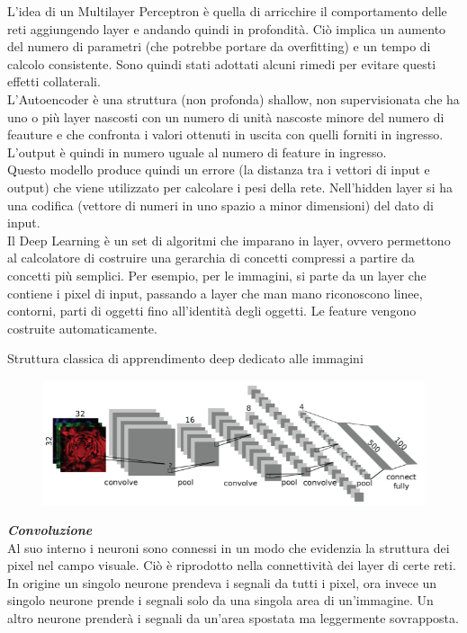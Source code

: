 L’idea di un Multilayer Perceptron è quella di arricchire il comportamento delle reti aggiungendo layer e andando quindi in profondità. Ciò implica un aumento del numero di parametri (che potrebbe portare da overfitting) e un tempo di calcolo consistente. Sono quindi stati adottati alcuni rimedi per evitare questi effetti collaterali.\\

L’Autoencoder è una struttura (non profonda) shallow, non supervisionata che ha uno o più layer nascosti con un numero di unità nascoste minore del numero di feauture e che confronta i valori ottenuti in uscita con quelli forniti in ingresso. L’output è quindi in numero uguale al numero di feature in ingresso. \\
Questo modello produce quindi un errore (la distanza tra i vettori di input e output) che viene utilizzato per calcolare i pesi della rete.
Nell’hidden layer si ha una codifica (vettore di numeri in uno spazio a minor dimensioni) del dato di input.\\

Il Deep Learning è un set di algoritmi che imparano in layer, ovvero permettono al calcolatore di costruire una gerarchia di concetti compressi a partire da concetti più semplici.
Per esempio, per le immagini, si parte da un layer che contiene i pixel di input, passando a layer che man mano riconoscono linee, contorni, parti di oggetti fino all’identità degli oggetti.
Le feature vengono costruite automaticamente.

Struttura classica di apprendimento deep dedicato alle immagini
\begin{figure}[H]
    \centering
    \includegraphics[scale=.8]{imm/imanges-deep.png}
\end{figure}

\textbf{\textit{Convoluzione}}\\

Al suo interno i neuroni sono connessi in un modo che evidenzia la struttura dei pixel nel campo visuale. Ciò è riprodotto nella connettività dei layer di certe reti. In origine un singolo neurone prendeva i segnali da tutti i pixel, ora invece un singolo neurone prende i segnali solo da una singola area di un’immagine. Un altro neurone prenderà i segnali da un’area spostata ma leggermente sovrapposta.\\

